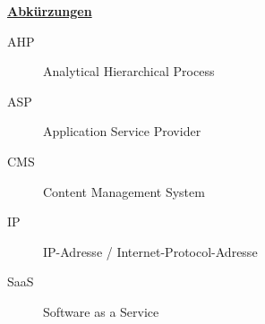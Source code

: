 \newpage
\textbf{\underline{Abkürzungen}}
\begin{description}
    \item[AHP] Analytical Hierarchical Process
    \item[ASP] Application Service Provider
    \item[CMS] Content Management System
    \item[IP] IP-Adresse / Internet-Protocol-Adresse
    \item[SaaS] Software as a Service
  \end{description}